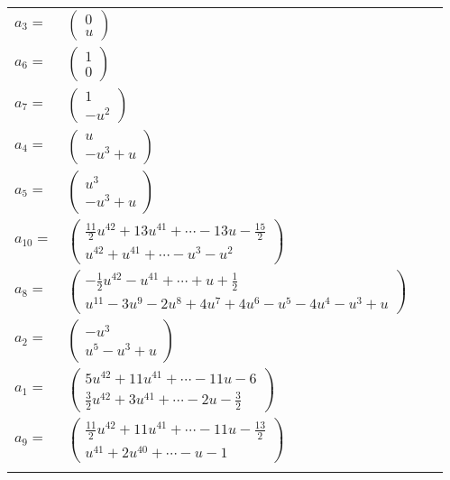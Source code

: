 \documentclass[1p]{elsarticle_modified}
\theoremstyle{definition}
\begin{document}
\begin{tabular}{m{7pt} m{180pt} m{7pt} m{180pt} }
\flushright $a_{3}=$&$\begin{pmatrix}0\\u\end{pmatrix}$ \\
\flushright $a_{6}=$&$\begin{pmatrix}1\\0\end{pmatrix}$ \\
\flushright $a_{7}=$&$\begin{pmatrix}1\\- u^2\end{pmatrix}$ \\
\flushright $a_{4}=$&$\begin{pmatrix}u\\- u^3+u\end{pmatrix}$ \\
\flushright $a_{5}=$&$\begin{pmatrix}u^3\\- u^3+u\end{pmatrix}$ \\
\flushright $a_{10}=$&$\begin{pmatrix}\frac{11}{2} u^{42}+13 u^{41}+\cdots-13 u-\frac{15}{2}\\u^{42}+u^{41}+\cdots- u^3- u^2\end{pmatrix}$ \\
\flushright $a_{8}=$&$\begin{pmatrix}-\frac{1}{2} u^{42}- u^{41}+\cdots+u+\frac{1}{2}\\u^{11}-3 u^9-2 u^8+4 u^7+4 u^6- u^5-4 u^4- u^3+u\end{pmatrix}$ \\
\flushright $a_{2}=$&$\begin{pmatrix}- u^3\\u^5- u^3+u\end{pmatrix}$ \\
\flushright $a_{1}=$&$\begin{pmatrix}5 u^{42}+11 u^{41}+\cdots-11 u-6\\\frac{3}{2} u^{42}+3 u^{41}+\cdots-2 u-\frac{3}{2}\end{pmatrix}$ \\
\flushright $a_{9}=$&$\begin{pmatrix}\frac{11}{2} u^{42}+11 u^{41}+\cdots-11 u-\frac{13}{2}\\u^{41}+2 u^{40}+\cdots- u-1\end{pmatrix}$\\&\end{tabular}
\end{document}
